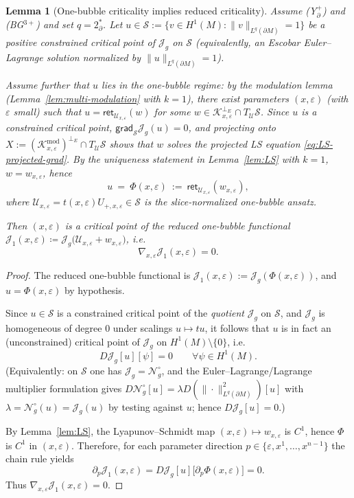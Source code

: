 \documentclass[11pt,reqno,a4paper]{amsart}
\numberwithin{equation}{section}
\theoremstyle{plain}
\newtheorem{lemma}[theorem]{Lemma}
\theoremstyle{remark}
\theoremstyle{plain}
\begin{document}
\begin{lemma}[One-bubble criticality implies reduced criticality]\label{lem:onebubble-to-reduced-criticality}
Assume \textup{(Y$^+_{\partial}$)} and \textup{(BG$^{3+}$)} and set $q=2^*_\partial$.
Let $u\in\mathcal S:=\{v\in H^1(M):\|v\|_{L^q(\partial M)}=1\}$ be a \emph{positive} constrained critical point of
$\mathcal J_g$ on $\mathcal S$ (equivalently, an Escobar Euler--Lagrange solution normalized by
$\|u\|_{L^q(\partial M)}=1$).

Assume further that $u$ lies in the one-bubble regime:
by the modulation lemma
(Lemma~\ref{lem:multi-modulation} with $k=1$), there exist parameters $(x,\varepsilon)$ (with $\varepsilon$ small) such that
$u=\mathsf{ret}_{\mathcal U_{x,\varepsilon}}(w)$ for some
$w\in\mathcal K_{x,\varepsilon}^{\perp_E}\cap T_{\mathcal U}\mathcal S$.
Since $u$ is a constrained critical point, $\mathsf{grad}_{\mathcal S}\mathcal J_g(u)=0$,
and projecting onto $X:=(\mathcal K_{x,\varepsilon}^{\mathrm{mod}})^{\perp_E}\cap T_{\mathcal U}\mathcal S$
shows that $w$ solves the projected LS equation \eqref{eq:LS-projected-grad}.
By the uniqueness statement in Lemma~\ref{lem:LS} with $k=1$, $w=w_{x,\varepsilon}$, hence
\[
u\ =\ \Phi(x,\varepsilon)\ :=\ \mathsf{ret}_{\mathcal U_{x,\varepsilon}}(w_{x,\varepsilon}),
\]
where $\mathcal U_{x,\varepsilon}=t(x,\varepsilon)U_{+,x,\varepsilon}\in\mathcal S$ is the slice-normalized one-bubble
ansatz.

Then $(x,\varepsilon)$ is a critical point of the reduced one-bubble functional $\mathcal J_1(x,\varepsilon)\coloneqq\mathcal J_g\big(\mathcal U_{x,\varepsilon}+w_{x,\varepsilon}\big)$, i.e.\[\nabla_{x,\varepsilon}\mathcal J_1(x,\varepsilon)=0.\]
\end{lemma}

\begin{proof}
The reduced one-bubble functional is $\mathcal J_1(x,\varepsilon):=\mathcal J_g(\Phi(x,\varepsilon))$, and $u=\Phi(x,\varepsilon)$ by hypothesis.

Since $u\in\mathcal S$ is a constrained critical point of the \emph{quotient} $\mathcal J_g$ on $\mathcal S$,
and $\mathcal J_g$ is homogeneous of degree $0$ under scalings $u\mapsto t u$, it follows that $u$ is in fact an
(unconstrained) critical point of $\mathcal J_g$ on $H^1(M)\setminus\{0\}$, i.e.
\[
D\mathcal J_g[u][\psi]=0\qquad\forall\psi\in H^1(M).
\]
(Equivalently: on $\mathcal S$ one has $\mathcal J_g=\mathcal N_g^\circ$, and the Euler--Lagrange/Lagrange multiplier
formulation gives $D\mathcal N_g^\circ[u]=\lambda D(\|\cdot\|_{L^q(\partial M)}^2)[u]$ with $\lambda=\mathcal N_g^\circ(u)
=\mathcal J_g(u)$ by testing against $u$; hence $D\mathcal J_g[u]=0$.)

By Lemma~\ref{lem:LS}, the Lyapunov--Schmidt map $(x,\varepsilon)\mapsto w_{x,\varepsilon}$ is $C^1$, hence
$\Phi$ is $C^1$ in $(x,\varepsilon)$. Therefore, for each parameter direction
$p\in\{\varepsilon,x^1,\dots,x^{n-1}\}$ the chain rule yields
\[
\partial_p \mathcal J_1(x,\varepsilon)
= D\mathcal J_g[u]\big[\partial_p\Phi(x,\varepsilon)\big]
=0.
\]
Thus $\nabla_{x,\varepsilon}\mathcal J_1(x,\varepsilon)=0$.
\end{proof}
\end{document}
